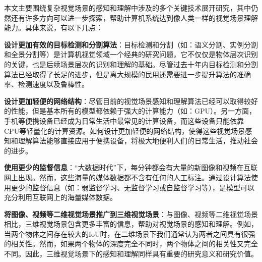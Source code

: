 本文主要围绕复杂视觉场景的感知和理解中涉及的多个关键技术展开研究，其中仍然还有许多方向可以进一步探索，帮助计算机系统达到像人类一样的视觉场景理解能力。具体来说，有以下几点：
\begin{asparaenum}
\item \textbf{设计更加有效的目标检测和分割算法}：目标检测和分割（如：语义分割、实例分割和全景分割等）是计算机视觉领域一个经典的研究问题，它不仅仅是物体层次识别的关键，也是后续场景层次的识别和理解的基础。尽管过去十年内目标检测和分割算法已经取得了长足的进步，但是离大规模的民用还需要进一步提升算法的准确率、检测速度以及鲁棒性。

\item \textbf{设计更加轻便的网络结构}：尽管目前的视觉场景感知和理解算法已经可以取得较好的性能，但是基本所有的模型都依赖于强大的计算能力（如：GPU）。另一方面，手机等便携设备已经成为日常生活中最常见的计算设备，而这些设备只能依靠CPU等轻量化的计算资源。如何设计更加轻便的网络结构，使得这些视觉场景感知和理解算法能够直接应用于便携设备，将极大地便利人们的日常生活，推动社会的进步。

\item \textbf{使用更少的监督信息}：“大数据时代”下，每分钟都会有大量的新图像和视频在互联网上出现。然而，这些海量的媒体数据都不含有任何的人工标注。通过设计算法使用更少的监督信息（如：弱监督学习、无监督学习或自监督学习等），是模型可以充分利用互联网上的海量媒体数据。

\item \textbf{将图像、视频等二维视觉场景推广到三维视觉场景}：与图像、视频等二维视觉场景相比，三维视觉场景包含更多丰富的信息，帮助对视觉场景的感知和理解。例如，当两个物体之间存在较大的IoU时，在二维场景下我们通常认为两者之间具有很强的相关性。然而，如果两个物体的深度完全不同时，两个物体之间的相关性又完全不同。因此，三维视觉场景下的感知和理解同样具有重要的研究意义和研究价值。

\end{asparaenum}
